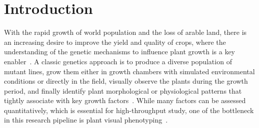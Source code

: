 \section{Introduction}
\label{sec:intro}

With the rapid growth of world population  and the loss of arable land, there is an increasing desire to improve the yield and quality of crops, where the understanding of the genetic mechanisms to influence plant growth is a key enabler~\cite{doos2002population}.
%
A classic genetics approach is to produce a diverse population of mutant lines, grow them either in growth chambers with simulated environmental conditions or directly in the field, visually observe the plants during the growth period, and finally identify plant morphological or physiological patterns that tightly associate with key growth factors~\cite{houle2010phenomics}.
%
While many factors can be assessed quantitatively, which is essential for high-throughput study, one of the bottleneck in this research pipeline is plant visual phenotyping~\cite{walter2015plant}.

